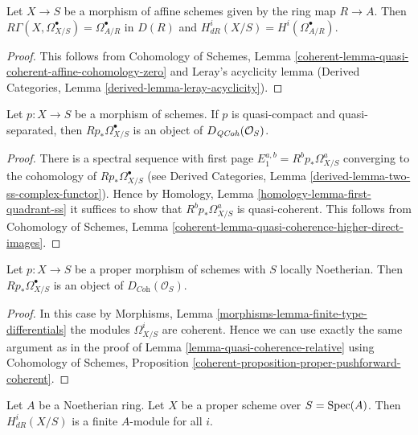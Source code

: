 \begin{lemma}
\label{lemma-de-rham-affine}
Let $X \to S$ be a morphism of affine schemes given by the ring map
$R \to A$. Then $R\Gamma(X, \Omega^\bullet_{X/S}) = \Omega^\bullet_{A/R}$
in $D(R)$ and $H^i_{dR}(X/S) = H^i(\Omega^\bullet_{A/R})$.
\end{lemma}

\begin{proof}
This follows from Cohomology of Schemes, Lemma
\ref{coherent-lemma-quasi-coherent-affine-cohomology-zero}
and Leray's acyclicity lemma
(Derived Categories, Lemma \ref{derived-lemma-leray-acyclicity}).
\end{proof}

\begin{lemma}
\label{lemma-quasi-coherence-relative}
Let $p : X \to S$ be a morphism of schemes. If $p$ is quasi-compact
and quasi-separated, then $Rp_*\Omega^\bullet_{X/S}$ is an object
of $D_{\mathit{QCoh}}(\mathcal{O}_S)$.
\end{lemma}

\begin{proof}
There is a spectral sequence with first page
$E_1^{a, b} = R^bp_*\Omega^a_{X/S}$ converging to
the cohomology of $Rp_*\Omega^\bullet_{X/S}$
(see Derived Categories, Lemma \ref{derived-lemma-two-ss-complex-functor}).
Hence by Homology, Lemma \ref{homology-lemma-first-quadrant-ss}
it suffices to show that $R^bp_*\Omega^a_{X/S}$ is quasi-coherent.
This follows from Cohomology of Schemes, Lemma
\ref{coherent-lemma-quasi-coherence-higher-direct-images}.
\end{proof}

\begin{lemma}
\label{lemma-coherence-relative}
Let $p : X \to S$ be a proper morphism of schemes with $S$ locally
Noetherian. Then $Rp_*\Omega^\bullet_{X/S}$ is an object
of $D_{\textit{Coh}}(\mathcal{O}_S)$.
\end{lemma}

\begin{proof}
In this case by Morphisms, Lemma \ref{morphisms-lemma-finite-type-differentials}
the modules $\Omega^i_{X/S}$ are coherent. Hence we can use exactly the
same argument as in the proof of Lemma \ref{lemma-quasi-coherence-relative}
using Cohomology of Schemes, Proposition
\ref{coherent-proposition-proper-pushforward-coherent}.
\end{proof}

\begin{lemma}
\label{lemma-finite-de-Rham}
Let $A$ be a Noetherian ring. Let $X$ be a proper scheme over $S = \mathop{\mathrm{Spec}}(A)$.
Then $H^i_{dR}(X/S)$ is a finite $A$-module for all $i$.
\end{lemma}

